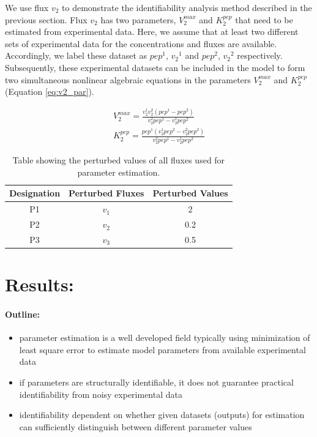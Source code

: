 \documentclass[10pt]{article}
\begin{document}
	We use flux $v_2$ to demonstrate the identifiability analysis method described in the previous section. Flux $v_2$ has two parameters, $V_2^{max}$ and $K_2^{pep}$ that need to be estimated from experimental data. Here, we assume that at least two different sets of experimental data for the concentrations and fluxes are available. Accordingly, we label these dataset as ${pep}^1$, ${v_2}^1$ and ${pep}^2$, ${v_2}^2$ respectively. Subsequently, these experimental datasets can be included in the model to form two simultaneous nonlinear algebraic equations in the parameters $V_2^{max}$ and $K_2^{pep}$ (Equation \ref{eq:v2_par}).
	
	\begin{subequations}\label{eq:v2_par}
		\begin{align}		
		V_2^{max} = \frac{v_2^1v_2^2(pep^1-pep^2)}{v_2^2pep^1-v_2^1pep^2}\\
		K_2^{pep} = \frac{pep^1(v_2^1pep^2-v_2^2pep^2)}{v_2^2pep^1-v_2^1pep^2}
		\end{align}
	\end{subequations}
	
	\begin{table}[!tbhp]
		\caption{Table showing the perturbed values of all fluxes used for parameter estimation.}
		\begin{center}				
			\begin{tabular}{ccc}
				Designation & Perturbed Fluxes & Perturbed Values\\
				\hline
				P1 & $v_1$ & 2\\
				P2 & $v_2$ & 0.2\\
				P3 & $v_3$ & 0.5
			\end{tabular}
		\end{center}	
		\label{tab:pval}
	\end{table}

	\section{Results:}
	\paragraph{Outline:}
	\begin{itemize}
		\item parameter estimation is a well developed field typically using minimization of least square error to estimate model parameters from available experimental data
		\item if parameters are structurally identifiable, it does not guarantee practical identifiability from noisy experimental data
		\item identifiability dependent on whether given datasets (outputs) for estimation can sufficiently distinguish between different parameter values
	\end{itemize}
	
\end{document}
